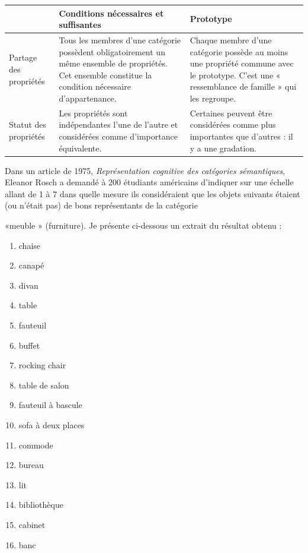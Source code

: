 {\small\renewcommand{\arraystretch}{1.12}\setlength{\tabcolsep}{5pt}
\begin{longtable}{@{}>{\raggedright\arraybackslash}p{.17\linewidth}>{\raggedright\arraybackslash}p{.39\linewidth}>{\raggedright\arraybackslash}p{.37\linewidth}@{}}
\toprule
 & Conditions nécessaires et suffisantes & Prototype\\
\midrule
Partage des propriétés & Tous les membres d’une catégorie possèdent obligatoirement un même ensemble de propriétés. Cet ensemble constitue la condition nécessaire d’appartenance. & Chaque membre d’une catégorie possède au moins une propriété commune avec le prototype. C’est une « ressemblance de famille » qui les regroupe.\\
\addlinespace
Statut des propriétés & Les propriétés sont indépendantes l’une de l’autre et considérées comme d’importance équivalente. & Certaines peuvent être considérées comme plus importantes que d’autres : il y a une gradation.\\
\bottomrule
\end{longtable}}


Dans un article de 1975, \emph{Représentation cognitive des catégories sémantiques}, Eleanor Rosch a demandé à 200 étudiants américains d’indiquer sur une échelle allant de 1 à 7 dans quelle mesure ils considéraient que les objets suivants étaient (ou n’était pas) de bons représentants de la catégorie\par

«meuble » (furniture). Je présente ci-dessous un extrait du résultat obtenu :\par

\begin{enumerate}[label=\arabic*.,nosep]
\item chaise
\item canapé
\item divan
\item table
\item fauteuil
\item buffet
\item rocking chair
\item table de salon
\item fauteuil à bascule
\item sofa à deux places
\item commode
\item bureau
\item lit
\item bibliothèque
\item cabinet
\item banc
\end{enumerate}

